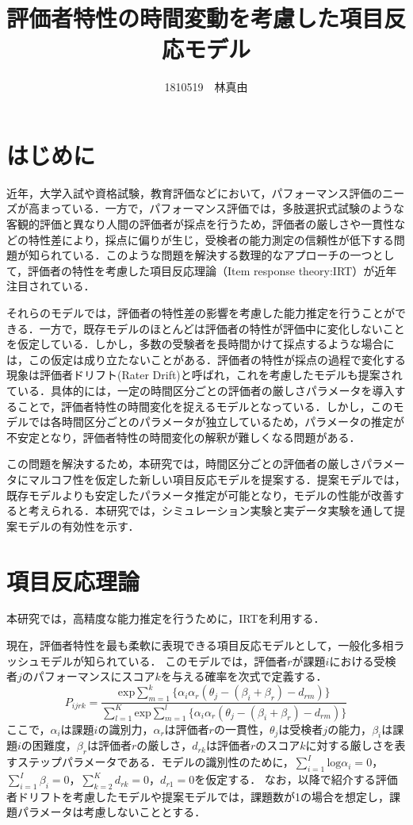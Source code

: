 \documentclass[dvipdfmx, twocolumn, a4paper]{hcresume}
\title{\bf 評価者特性の時間変動を考慮した項目反応モデル}
\author{1810519　林真由}
\begin{document}
\maketitle
\pagestyle{empty}
\thispagestyle{empty}
\section{はじめに}
近年，大学入試や資格試験，教育評価などにおいて，パフォーマンス評価のニーズが高まっている．一方で，パフォーマンス評価では，多肢選択式試験のような客観的評価と異なり人間の評価者が採点を行うため，評価者の厳しさや一貫性などの特性差により，採点に偏りが生じ，受検者の能力測定の信頼性が低下する問題が知られている．このような問題を解決する数理的なアプローチの一つとして，評価者の特性を考慮した項目反応理論（Item response theory:IRT）\cite{IRTLord}が近年注目されている．

それらのモデルでは，評価者の特性差の影響を考慮した能力推定を行うことができる．一方で，既存モデルのほとんどは評価者の特性が評価中に変化しないことを仮定している．しかし，多数の受験者を長時間かけて採点するような場合には，この仮定は成り立たないことがある．評価者の特性が採点の過程で変化する現象は評価者ドリフト(Rater Drift)と呼ばれ，これを考慮したモデルも提案されている．具体的には，一定の時間区分ごとの評価者の厳しさパラメータを導入することで，評価者特性の時間変化を捉えるモデルとなっている．しかし，このモデルでは各時間区分ごとのパラメータが独立しているため，パラメータの推定が不安定となり，評価者特性の時間変化の解釈が難しくなる問題がある．

この問題を解決するため，本研究では，時間区分ごとの評価者の厳しさパラメータにマルコフ性を仮定した新しい項目反応モデルを提案する．提案モデルでは，既存モデルよりも安定したパラメータ推定が可能となり，モデルの性能が改善すると考えられる．本研究では，シミュレーション実験と実データ実験を通して提案モデルの有効性を示す．

\section{項目反応理論}
本研究では，高精度な能力推定を行うために，IRTを利用する．

現在，評価者特性を最も柔軟に表現できる項目反応モデルとして，一般化多相ラッシュモデルが知られている\cite{g-MFRM}．
このモデルでは，評価者$r$が課題$i$における受検者$j$のパフォーマンスにスコア$k$を与える確率を次式で定義する．
\begin{displaymath}
  P_{ijrk}=\frac{\mathrm{exp}\sum_{m=1}^{k}\{\alpha_i\alpha_r(\theta_{j}-(\beta_{i}+\beta_{r})-d_{rm})\}}{\sum_{l=1}^{K}\mathrm{exp}\sum_{m=1}^{l}\{\alpha_i\alpha_r(\theta_{j}-(\beta_{i}+\beta_{r})-d_{rm})\}}
\end{displaymath}
ここで，$\alpha_i$は課題$i$の識別力，$\alpha_r$は評価者$r$の一貫性，$\theta_j$は受検者$j$の能力，$\beta_i$は課題$i$の困難度，$\beta_r$は評価者$r$の厳しさ，$d_{rk}$は評価者$r$のスコア$k$に対する厳しさを表すステップパラメータである．モデルの識別性のために，$\sum^{I}_{i=1}{\mathrm{log}\alpha_i}=0$，$\sum^{I}_{i=1}{\beta_i}=0$，$\sum^{K}_{k=2}{d_{rk}}=0$，$d_{r1}=0$を仮定する．
なお，以降で紹介する評価者ドリフトを考慮したモデルや提案モデルでは，課題数が1の場合を想定し，課題パラメータは考慮しないこととする．
\end{document}
